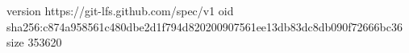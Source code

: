version https://git-lfs.github.com/spec/v1
oid sha256:c874a958561c480dbe2d1f794d820200907561ee13db83dc8db090f72666bc36
size 353620
